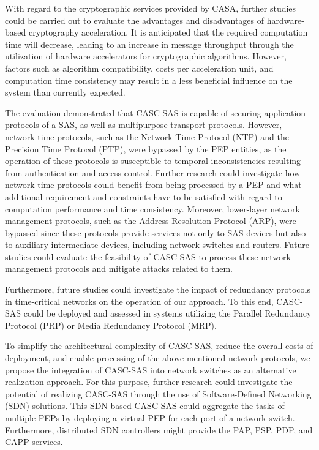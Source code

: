 With regard to the cryptographic services provided by CASA, further studies could be carried out to evaluate the advantages and disadvantages of hardware-based cryptography acceleration.
It is anticipated that the required computation time will decrease, leading to an increase in message throughput through the utilization of hardware accelerators for cryptographic algorithms.
However, factors such as algorithm compatibility, costs per acceleration unit, and computation time consistency may result in a less beneficial influence on the system than currently expected.

The evaluation demonstrated that CASC-SAS is capable of securing application protocols of a SAS, as well as multipurpose transport protocols.
However, network time protocols, such as the Network Time Protocol (NTP) and the Precision Time Protocol (PTP), were bypassed by the PEP entities, as the operation of these protocols is susceptible to temporal inconsistencies resulting from authentication and access control.
Further research could investigate how network time protocols could benefit from being processed by a PEP and what additional requirement and constraints have to be satisfied with regard to computation performance and time consistency.
Moreover, lower-layer network management protocols, such as the Address Resolution Protocol (ARP), were bypassed since these protocols provide services not only to SAS devices but also to auxiliary intermediate devices, including network switches and routers.
Future studies could evaluate the feasibility of CASC-SAS to process these network management protocols and mitigate attacks related to them.

Furthermore, future studies could investigate the impact of redundancy protocols in time-critical networks on the operation of our approach.
To this end, CASC-SAS could be deployed and assessed in systems utilizing the Parallel Redundancy Protocol (PRP) or Media Redundancy Protocol (MRP).

To simplify the architectural complexity of CASC-SAS, reduce the overall costs of deployment, and enable processing of the above-mentioned network protocols, we propose the integration of CASC-SAS into network switches as an alternative realization approach.
For this purpose, further research could investigate the potential of realizing CASC-SAS through the use of Software-Defined Networking (SDN) solutions.
This SDN-based CASC-SAS could aggregate the tasks of multiple PEPs by deploying a virtual PEP for each port of a network switch.
Furthermore, distributed SDN controllers might provide the PAP, PSP, PDP, and CAPP services.


